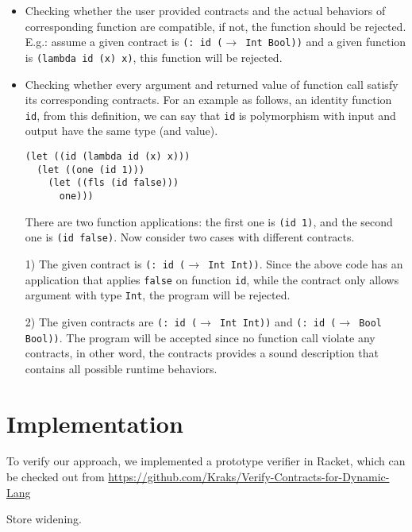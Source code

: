 \documentclass[paper=a4, fontsize=11pt]{scrartcl} %
\numberwithin{equation}{section} %
\numberwithin{figure}{section} %
\numberwithin{table}{section} %
\begin{document}
\begin{itemize}
\item Checking whether the user provided contracts and the actual behaviors of corresponding function are compatible, if not, the function should be rejected. E.g.: assume a given contract is \texttt{(: id ($\rightarrow$ Int Bool))} and a given function is \texttt{(lambda\ id\ (x)\ x)}, this function will be rejected.

\item Checking whether every argument and returned value of function call satisfy its corresponding contracts. For an example as follows, an identity function \texttt{id}, from this definition, we can say that \texttt{id} is polymorphism with input and output have the same type (and value).

\begin{verbatim}
(let ((id (lambda id (x) x)))
  (let ((one (id 1)))
    (let ((fls (id false)))
      one)))
\end{verbatim}

There are two function applications: the first one is \texttt{(id 1)}, and the second one is \texttt{(id false)}. Now consider two cases with different contracts.

1) The given contract is \texttt{(: id ($\rightarrow$ Int Int))}. Since the above code has an application that applies \texttt{false} on function \texttt{id}, while the contract only allows argument with type \texttt{Int}, the program will be rejected.

2) The given contracts are \texttt{(: id ($\rightarrow$ Int Int))} and \texttt{(: id ($\rightarrow$ Bool Bool))}. The program will be accepted since no function call violate any contracts, in other word, the contracts provides a sound description that contains all possible runtime behaviors.
\end{itemize}


\section{Implementation}

To verify our approach, we implemented a prototype verifier in Racket, which can be checked out from \url{https://github.com/Kraks/Verify-Contracts-for-Dynamic-Lang}

Store widening.

\end{document}
